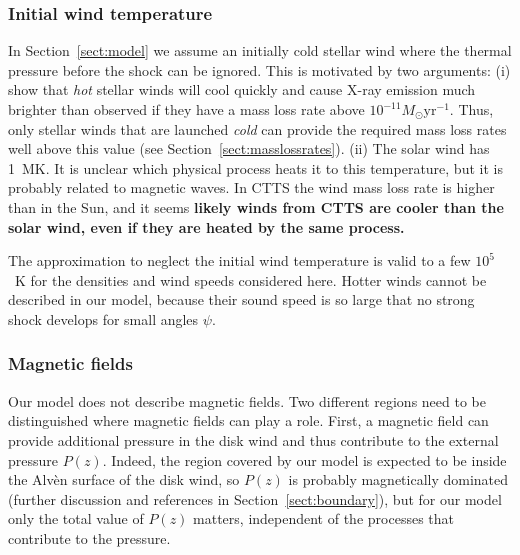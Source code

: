\documentclass[manuscript]{aastex}
\begin{document}
\subsubsection{Initial wind temperature}
\label{sect:T_0}
In Section~\ref{sect:model} we assume an initially cold stellar wind where the thermal pressure before the shock can be ignored. This is motivated by two arguments: (i) \citet{2007IAUS..243..299M} show that {\it hot} stellar winds will cool quickly and cause X-ray emission much brighter than observed if they have a mass loss rate above $10^{-11}M_\odot\mathrm{ yr}^{-1}$. Thus, only stellar winds that are launched {\it cold} can provide the required mass loss rates well above this value (see Section~\ref{sect:masslossrates}). (ii) The solar wind has 1~MK. It is unclear which physical process heats it to this temperature, but it is probably related to magnetic waves. In CTTS the wind mass loss rate is  higher than in the Sun, and it seems \textbf{likely winds from CTTS are cooler than the solar wind, even if they are heated by the same process.}

The approximation to neglect the initial wind temperature is valid to a few $10^5$~K for the densities and wind speeds considered here. Hotter winds cannot be described in our model, because their sound speed is so large that no strong shock develops for small angles $\psi$.

\subsubsection{Magnetic fields}
Our model does not describe magnetic fields.
Two different regions need to be distinguished where magnetic fields can play a role. First, a magnetic field can provide additional pressure in the disk wind and thus contribute to the external pressure $P(z)$. Indeed, the region covered by our model is expected to be inside the Alv\`en surface of the disk wind, so $P(z)$ is probably magnetically dominated (further discussion and references in Section~\ref{sect:boundary}), but for our model only the total value of $P(z)$ matters, independent of the processes that contribute to the pressure. 
\end{document}
